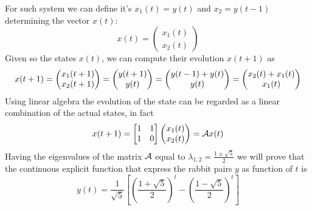 	For such system we can define it's  $x_1(t) = y(t)$ and $x_2 = y(t-1)$ determining the vector $x(t)$:
	\begin{equation}
		x(t) = \begin{pmatrix}
			x_1(t) \\ x_2(t)
		\end{pmatrix}
	\end{equation}
	Given so the states $x(t)$, we can compute their evolution $x(t+1)$ as
	\[ x(t+1) = \begin{pmatrix} x_1(t+1) \\ x_2(t+1) \end{pmatrix} = \begin{pmatrix} y(t+1) \\ y(t) \end{pmatrix} = \begin{pmatrix} y(t-1) + y(t) \\ y(t) \end{pmatrix} = \begin{pmatrix} x_2(t) + x_1(t) \\ x_1(t) \end{pmatrix}\]
	Using linear algebra the evolution of the state can be regarded as a linear combination of the actual states, in fact
	\begin{equation} \label{eq:dyn:temp4}
		x(t+1) = \begin{bmatrix} 1 & 1 \\ 1 & 0 \end{bmatrix} \begin{pmatrix} x_1(t) \\ x_2(t) \end{pmatrix} = \mathcal{A} x(t)
	\end{equation}
	Having the eigenvalues of the matrix $\mathcal{A}$ equal to $\lambda_{1,2} = \frac{1 \pm \sqrt 5}{2}$ we will prove that the continuous explicit function that express the rabbit pairs $y$ as function of $t$ is
	\[ y(t) = \frac1{\sqrt{5}} \left[ \left(\frac{1 + \sqrt 5}{2}\right)^t - \left(\frac{1 - \sqrt 5}{2}\right)^t \right] \]
	
